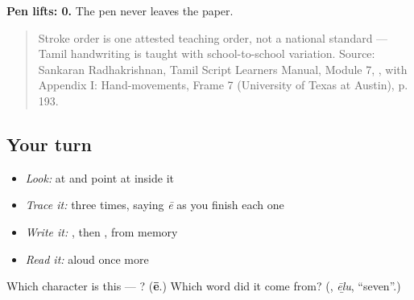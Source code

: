 \textbf{Pen lifts: 0.} The pen never leaves the paper.

\begin{quote}
Stroke order is one attested teaching order, not a national standard — Tamil handwriting is taught with school-to-school variation. Source: Sankaran Radhakrishnan, Tamil Script Learners Manual, Module 7, , with Appendix I: Hand-movements, Frame 7 (University of Texas at Austin), p. 193.
\end{quote}

\subsection*{Your turn}
\begin{itemize}
\raggedright
  \item \emph{Look:} at \textbf{} and point at  inside it
  \item \emph{Trace it:}  three times, saying \emph{ē} as you finish each one
  \item \emph{Write it:} , then , from memory
  \item \emph{Read it:} \textbf{} aloud once more
\end{itemize}

\begin{tcolorbox}[breakable,colback=teal!4,colframe=teal!35!black,title={Before you move on}]
Which character is this — ? (\textbf{ē}.) Which word did it come from? (\textbf{}, \emph{ēḻu}, \textquotedblleft{}seven\textquotedblright{}.)
\end{tcolorbox}
